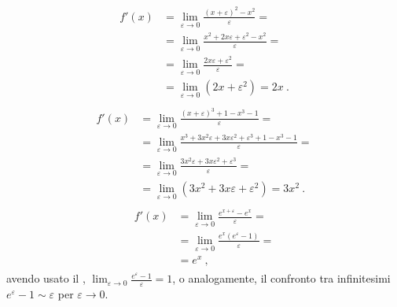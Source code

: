 \documentclass[letterpaper,10pt,italian]{jupyterBook}
\begin{document}
\sphinxAtStartPar
{}
\begin{equation*}
\begin{split}\begin{aligned}
  f'(x) 
  & = \lim_{\varepsilon \to 0} \frac{(x+\varepsilon)^2 - x^2}{\varepsilon} = \\
  & = \lim_{\varepsilon \to 0} \frac{x^2+ 2 x \varepsilon + \varepsilon^2 - x^2}{\varepsilon} = \\
  & = \lim_{\varepsilon \to 0} \frac{2 x \varepsilon + \varepsilon^2}{\varepsilon} = \\
  & = \lim_{\varepsilon \to 0} \left( 2 x + \varepsilon^2 \right) = 2x  \ .
\end{aligned}\end{split}
\end{equation*}
\sphinxAtStartPar
{}
\begin{equation*}
\begin{split}\begin{aligned}
  f'(x) 
  & = \lim_{\varepsilon \to 0} \frac{(x+\varepsilon)^3+1 - x^3-1}{\varepsilon} = \\
  & = \lim_{\varepsilon \to 0} \frac{x^3+ 3 x^2 \varepsilon + 3 x \varepsilon^2 + \varepsilon^3 + 1 - x^3 - 1}{\varepsilon} = \\
  & = \lim_{\varepsilon \to 0} \frac{3 x^2 \varepsilon + 3 x \varepsilon^2 + \varepsilon^3}{\varepsilon} = \\
  & = \lim_{\varepsilon \to 0} \left( 3 x^2 + 3 x \varepsilon + \varepsilon^2 \right) = 3 x^2  \ .
\end{aligned}\end{split}
\end{equation*}
\sphinxAtStartPar
{}
\begin{equation*}
\begin{split}\begin{aligned}
  f'(x)
  & = \lim_{\varepsilon \to 0} \frac{e^{x+\varepsilon} - e^x}{\varepsilon} = \\
  & = \lim_{\varepsilon \to 0} \frac{e^{x} \left( e^{\varepsilon} - 1 \right)}{\varepsilon} = \\
  & = e^{x} \ ,
\end{aligned}\end{split}
\end{equation*}
\sphinxAtStartPar
avendo usato il {\hyperref[\detokenize{ch/infinitesimal_calculus/analysis:infinitesimal-calculus-limits-fund}]{}}, \(\lim_{\varepsilon \to 0} \frac{e^\varepsilon-1}{\varepsilon} = 1\), o analogamente, il confronto tra infinitesimi \(e^{\varepsilon} - 1 \sim \varepsilon\) per \(\varepsilon \to 0\).
\end{document}
